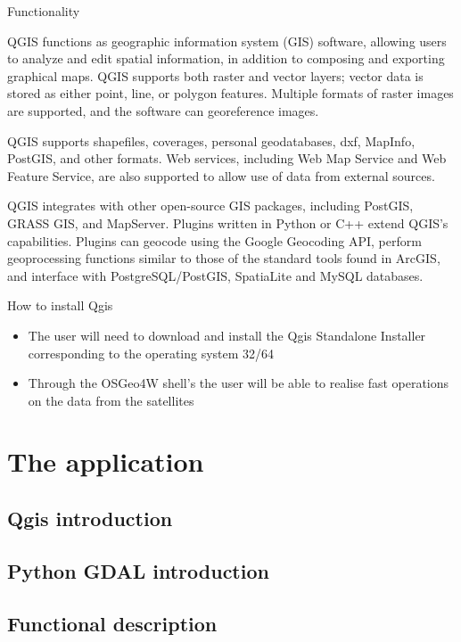 \documentclass[12pt, a4paper]{report}
\begin{document}
{\Large Functionality \par}

	QGIS functions as geographic information system (GIS) software, allowing users to analyze and edit spatial information, in addition to composing and exporting graphical maps. QGIS supports both raster and vector layers; vector data is stored as either point, line, or polygon features. Multiple formats of raster images are supported, and the software can georeference images.

	QGIS supports shapefiles, coverages, personal geodatabases, dxf, MapInfo, PostGIS, and other formats. Web services, including Web Map Service and Web Feature Service, are also supported to allow use of data from external sources.

	QGIS integrates with other open-source GIS packages, including PostGIS, GRASS GIS, and MapServer. Plugins written in Python or C++ extend QGIS's capabilities. Plugins can geocode using the Google Geocoding API, perform geoprocessing functions similar to those of the standard tools found in ArcGIS, and interface with PostgreSQL/PostGIS, SpatiaLite and MySQL databases. 

{\Large How to install Qgis\par}

\begin{itemize}
  \item The user will need to download and install the Qgis Standalone Installer corresponding to the operating system 32/64
  \item Through the OSGeo4W shell's the user will be able to realise fast operations on the data from the satellites
\end{itemize}


\newpage{}


\chapter{The application}

\section{Qgis introduction} 


\section{Python GDAL introduction} 

\section{Functional description} 
\end{document}
